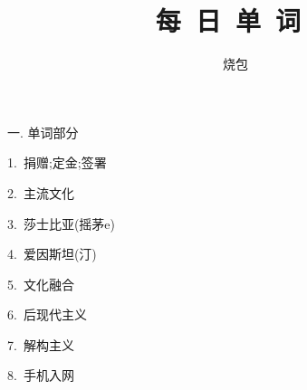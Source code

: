 \documentclass[a4paper, 12pt]{article}
\begin{document}
    \noindent

    \title{ 每\ 日\ 单\ 词\  }
    \author{ 烧包 }
    \maketitle

\begin{flushleft}
一. 单词部分
\end{flushleft}

\begin{multicols}{2}
\begin{flushleft}
1.\ 捐赠;定金;签署 \ \ \ \ \underline{\hspace{3cm}}
\end{flushleft}

\begin{flushleft}
2.\ 主流文化 \ \ \ \ \underline{\hspace{3cm}}
\end{flushleft}
\end{multicols}

\begin{multicols}{2}
\begin{flushleft}
3.\ 莎士比亚(摇茅e) \ \ \ \ \underline{\hspace{3cm}}
\end{flushleft}

\begin{flushleft}
4.\ 爱因斯坦(汀) \ \ \ \ \underline{\hspace{3cm}}
\end{flushleft}
\end{multicols}

\begin{multicols}{2}
\begin{flushleft}
5.\ 文化融合 \ \ \ \ \underline{\hspace{3cm}}
\end{flushleft}

\begin{flushleft}
6.\ 后现代主义 \ \ \ \ \underline{\hspace{3cm}}
\end{flushleft}
\end{multicols}

\begin{multicols}{2}
\begin{flushleft}
7.\ 解构主义 \ \ \ \ \underline{\hspace{3cm}}
\end{flushleft}

\begin{flushleft}
8.\ 手机入网 \ \ \ \ \underline{\hspace{3cm}}
\end{flushleft}
\end{multicols}
\end{document}
